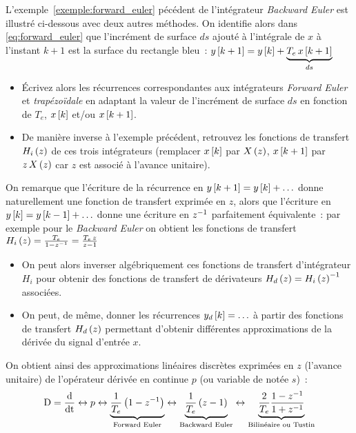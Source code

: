 \begin{exercice}

  L'exemple~\ref{exemple:forward_euler} pécédent de l'intégrateur
  \emph{Backward Euler} est illustré ci-dessous avec deux autres
  méthodes. On identifie alors dans \eqref{eq:forward_euler} que
  l'incrément de surface $ds$ ajouté à l'intégrale de $x$ à l'instant
  $k+1$ est la surface du rectangle bleu~:
  $y\left[k+1\right] = y\left[k\right] + \underbrace{T_e\,x\left[k+1\right]}_{ds}$


  \begin{itemize}
  \item Écrivez alors les récurrences correspondantes aux intégrateurs
    \emph{Forward Euler} et \emph{trapézoïdale} en adaptant la valeur
    de l'incrément de surface $ds$ en fonction de $T_e$, $x\left[k\right]$
    et/ou $x\left[k+1\right]$.
  \item De manière inverse à l'exemple précédent, retrouvez les
    fonctions de transfert $H_i\left(z\right)$ de ces trois intégrateurs
    (remplacer $x\left[k\right]$  par $X\left(z\right)$, $x\left[k+1\right]$ par $z\,X\left(z\right)$ car
    $z$ est associé à l'avance unitaire).
  \end{itemize}
  On remarque que l'écriture de la récurrence en
  $y\left[k+1\right]=y\left[k\right]+\ldots$ donne naturellement une fonction de
  transfert exprimée en $z$, alors que l'écriture en
  $y\left[k\right]=y\left[k-1\right]+\ldots$ donne une écriture en $z^{-1}$ parfaitement
  équivalente~: par exemple pour le \emph{Backward Euler} on obtient
  les fonctions de transfert
  $H_i\left(z\right)=\frac{T_e}{1-z^{-1}}=\frac{T_e\,z}{z-1}$

  \begin{itemize}
  \item On peut alors inverser algébriquement ces fonctions de
    transfert d'intégrateur $H_i$ pour obtenir des fonctions de
    transfert de dérivateurs $H_d\left(z\right)=H_i\left(z\right)^{-1}$ associées.
  \item On peut, de même, donner les récurrences $y_d\left[k\right]=\ldots$ à
    partir des fonctions de transfert $H_d\left(z\right)$ permettant d'obtenir
    différentes approximations de la dérivée du signal d'entrée $x$.
  \end{itemize}

  On obtient ainsi des approximations linéaires discrètes exprimées en
  $z$ (l'avance unitaire) de l'opérateur dérivée en continue $p$ (ou
  variable de \Laplace{} notée $s$)~:
  \begin{equation}
    \label{eq:approx_de_p}
    \mathrm{D}=\frac{\mathrm{d{}}}{\mathrm{d{t}}} \leftrightarrow p \leftrightarrow \underbrace{\frac{1}{T_e}\left(1-z^{-1}\right)}_{\text{Forward Euler}}\leftrightarrow \underbrace{\frac{1}{T_e}\left(z-1\right)}_{\text{Backward Euler}} \leftrightarrow \underbrace{\frac{2}{T_e}\frac{1-z^{-1}}{1+z^{-1}}}_{\text{Bilinéaire ou Tustin}} 
  \end{equation}  
\end{exercice}

